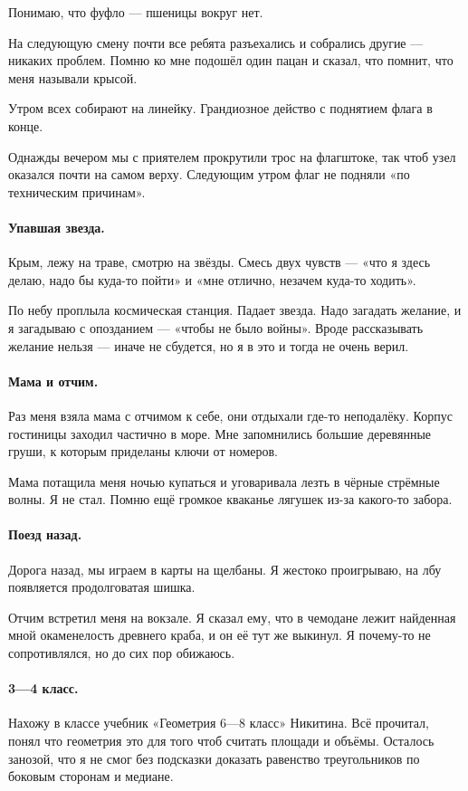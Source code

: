 \documentclass{book}
\begin{document}
Понимаю, что фуфло --- пшеницы вокруг нет.

На следующую смену почти все ребята разъехались и собрались другие ---
никаких проблем.
Помню ко мне подошёл один пацан и сказал, что помнит, что меня называли крысой.

Утром всех собирают на линейку.
Грандиозное действо с поднятием флага в конце.

Однажды вечером мы с приятелем прокрутили трос на флагштоке, так чтоб узел оказался почти на самом верху.
Следующим утром флаг не подняли «по техническим причинам».

\paragraph{Упавшая звезда.}
Крым, лежу на траве, смотрю на звёзды.
Смесь двух чувств --- «что я здесь делаю, надо бы куда-то пойти» и «мне отлично, незачем куда-то ходить».

По небу проплыла космическая станция.
Падает звезда. 
Надо загадать желание, и я загадываю с опозданием --- «чтобы не было войны».
Вроде рассказывать желание нельзя --- иначе не сбудется, но я в это и тогда не очень верил.

\paragraph{Мама и отчим.}
Раз меня взяла мама с отчимом к себе, они отдыхали где-то неподалёку.
Корпус гостиницы заходил частично в море.
Мне запомнились большие деревянные груши, к которым приделаны ключи от номеров.

Мама потащила меня ночью купаться и уговаривала лезть в чёрные стрёмные волны.
Я не стал.
Помню ещё громкое кваканье лягушек из-за какого-то забора.

\paragraph{Поезд назад.}
Дорога назад, мы играем в карты на щелбаны.
Я жестоко проигрываю, на лбу появляется продолговатая шишка.

Отчим встретил меня на вокзале. 
Я сказал ему, что в чемодане лежит найденная мной окаменелость древнего краба, и он её тут же выкинул.
Я почему-то не сопротивлялся, но до сих пор обижаюсь.


\paragraph{3---4 класс.}
Нахожу в классе учебник «Геометрия 6---8 класс» Никитина.
Всё прочитал, понял что геометрия это для того чтоб считать площади и объёмы.
Осталось занозой, что я не смог без подсказки доказать равенство треугольников по боковым сторонам и медиане.
\end{document}
